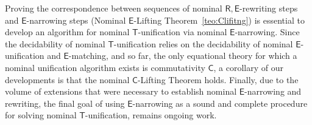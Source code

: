 \documentclass[11pt,a4paper]{amsart}
\newcommand{\alert}[1]{\textcolor{red}{#1}}
\newcommand{\theory}[1]{\ensuremath{\mathsf{#1}}}
\theoremstyle{plain}
\theoremstyle{definition}
\theoremstyle{remark}
\begin{document}
 Proving the correspondence between sequences of nominal \theory{R,E}-rewriting steps and \theory{E}-narrowing steps (Nominal \theory{E}-Lifting Theorem~\ref{teo:Clifitng}) is essential to develop an algorithm for nominal \theory{T}-unification via nominal \theory{E}-narrowing. Since the decidability of nominal \theory{T}-unification relies on the decidability of nominal \theory{E}-unification and \theory{E}-matching, and so far, the only equational theory for which a nominal unification algorithm exists is commutativity \theory{C}, a corollary of our developments is that the nominal \theory{C}-Lifting Theorem holds. Finally, due to the volume of extensions that were necessary to establish nominal \theory{E}-narrowing and rewriting, the final goal of using \theory{E}-narrowing as a sound and complete procedure for solving nominal \theory{T}-unification, remains ongoing work. 
 
 
 
 



\end{document}
